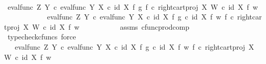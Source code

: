 \begin{isabellebody}
\ \ \ \ \isamarkupfalse%
\ {\isacharminus}{\kern0pt}\ \isanewline
\ \ \ \ \ \ \isamarkupfalse%
\ {\isachardoublequoteopen}eval{\isacharunderscore}{\kern0pt}func\ Z\ Y\ {\isasymcirc}\isactrlsub c\ {\isasymlangle}eval{\isacharunderscore}{\kern0pt}func\ Y\ X\ {\isasymcirc}\isactrlsub c\ {\isacharparenleft}{\kern0pt}id\ X\ {\isasymtimes}\isactrlsub f\ g{\isacharparenright}{\kern0pt}{\isacharcomma}{\kern0pt}\ f\ {\isasymcirc}\isactrlsub c\ right{\isacharunderscore}{\kern0pt}cart{\isacharunderscore}{\kern0pt}proj\ X\ W{\isasymrangle}\ {\isasymcirc}\isactrlsub c\ {\isacharparenleft}{\kern0pt}id\ X\ {\isasymtimes}\isactrlsub f\ w{\isacharparenright}{\kern0pt}\ \isanewline
\ \ \ \ \ \ \ \ \ \ {\isacharequal}{\kern0pt}\ \ eval{\isacharunderscore}{\kern0pt}func\ Z\ Y\ {\isasymcirc}\isactrlsub c\ {\isasymlangle}{\isacharparenleft}{\kern0pt}eval{\isacharunderscore}{\kern0pt}func\ Y\ X\ {\isasymcirc}\isactrlsub c\ {\isacharparenleft}{\kern0pt}id\ X\ {\isasymtimes}\isactrlsub f\ g{\isacharparenright}{\kern0pt}{\isacharparenright}{\kern0pt}\ {\isasymcirc}\isactrlsub c\ {\isacharparenleft}{\kern0pt}id\ X\ {\isasymtimes}\isactrlsub f\ w{\isacharparenright}{\kern0pt}{\isacharcomma}{\kern0pt}\ {\isacharparenleft}{\kern0pt}f\ {\isasymcirc}\isactrlsub c\ right{\isacharunderscore}{\kern0pt}cart{\isacharunderscore}{\kern0pt}proj\ X\ W{\isacharparenright}{\kern0pt}\ {\isasymcirc}\isactrlsub c\ {\isacharparenleft}{\kern0pt}id\ X\ {\isasymtimes}\isactrlsub f\ w{\isacharparenright}{\kern0pt}{\isasymrangle}{\isachardoublequoteclose}\isanewline
\ \ \ \ \ \ \ \ \ \isamarkupfalse%
\ assms\ cfunc{\isacharunderscore}{\kern0pt}prod{\isacharunderscore}{\kern0pt}comp\ \isamarkupfalse%
\ {\isacharparenleft}{\kern0pt}typecheck{\isacharunderscore}{\kern0pt}cfuncs{\isacharcomma}{\kern0pt}\ force{\isacharparenright}{\kern0pt}\isanewline
\ \ \ \ \ \ \ \isamarkupfalse%
\ \isamarkupfalse%
\ {\isachardoublequoteopen}{\isachardot}{\kern0pt}{\isachardot}{\kern0pt}{\isachardot}{\kern0pt}\ {\isacharequal}{\kern0pt}\ eval{\isacharunderscore}{\kern0pt}func\ Z\ Y\ {\isasymcirc}\isactrlsub c\ {\isasymlangle}eval{\isacharunderscore}{\kern0pt}func\ Y\ X\ {\isasymcirc}\isactrlsub c\ {\isacharparenleft}{\kern0pt}id\ X\ {\isasymtimes}\isactrlsub f\ g{\isacharparenright}{\kern0pt}\ {\isasymcirc}\isactrlsub c\ {\isacharparenleft}{\kern0pt}id\ X\ {\isasymtimes}\isactrlsub f\ w{\isacharparenright}{\kern0pt}{\isacharcomma}{\kern0pt}\ f\ {\isasymcirc}\isactrlsub c\ right{\isacharunderscore}{\kern0pt}cart{\isacharunderscore}{\kern0pt}proj\ X\ W\ {\isasymcirc}\isactrlsub c\ {\isacharparenleft}{\kern0pt}id\ X\ {\isasymtimes}\isactrlsub f\ w{\isacharparenright}{\kern0pt}{\isasymrangle}{\isachardoublequoteclose}\isanewline

\end{isabellebody}
